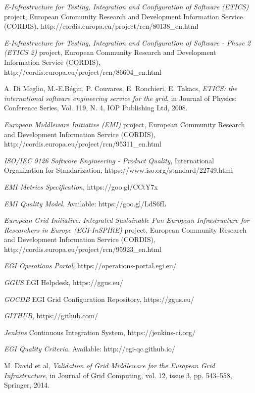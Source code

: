 \documentclass[journal]{IEEEtran}
\begin{document}
\begin{thebibliography}{1}
\emph{E-Infrastructure for Testing, Integration and Configuration of Software
(ETICS)} project, European Community Research and Development Information
Service (CORDIS), http://cordis.europa.eu/project/rcn/80138\_en.html

\emph{E-Infrastructure for Testing, Integration and Configuration of Software -
Phase 2 (ETICS 2)} project, European Community Research and Development
Information Service (CORDIS),
http://cordis.europa.eu/project/rcn/86604\_en.html

A. Di Meglio, M.-E.Bégin, P. Couvares, E. Ronchieri, E. Takacs, \emph{ETICS:
the international software engineering service for the grid}, in Journal of
Physics: Conference Series, Vol. 119, N. 4, IOP Publishing Ltd, 2008.

\emph{European Middleware Initiative (EMI)} project, European Community
Research and Development Information Service (CORDIS),
http://cordis.europa.eu/project/rcn/95311\_en.html

\emph{ISO/IEC 9126 Software Engineering - Product Quality}, International
Organization for Standarization, https://www.iso.org/standard/22749.html

\emph{EMI Metrics Specification}, https://goo.gl/CCtY7x


\emph{EMI Quality Model}. Available: https://goo.gl/LdS6fL

\emph{European Grid Initiative: Integrated Sustainable Pan-European
Infrastructure for Researchers in Europe (EGI-InSPIRE)} project, European
Community Research and Development Information Service (CORDIS),
http://cordis.europa.eu/project/rcn/95923\_en.html

\emph{EGI Operations Portal},
https://operations-portal.egi.eu/

\emph{GGUS} EGI Helpdesk,
https://ggus.eu/

\emph{GOCDB} EGI Grid Configuration Repository,
https://ggus.eu/

\emph{GITHUB},
https://github.com/

\emph{Jenkins} Continuous Integration System,
https://jenkins-ci.org/

\emph{EGI Quality Criteria}. Available: http://egi-qc.github.io/

M. David et al, \emph{Validation of Grid Middleware for the European Grid
Infrastructure}, in Journal of Grid Computing, vol. 12, issue 3, pp. 543–558,
Springer, 2014.


\end{thebibliography}
\end{document}
